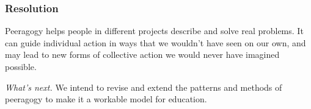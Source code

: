 

\subsubsection*{Resolution}
Peeragogy helps people in different projects describe and solve real problems.  It can guide individual action in ways that we wouldn't have seen on our own, and may lead to new forms of collective action we would never have imagined possible.

\begin{framed}
\noindent \emph{What's next.} We intend to revise and extend the patterns and methods of peeragogy to make it a workable model for education.
\end{framed}



    
    
    
    
    
    
